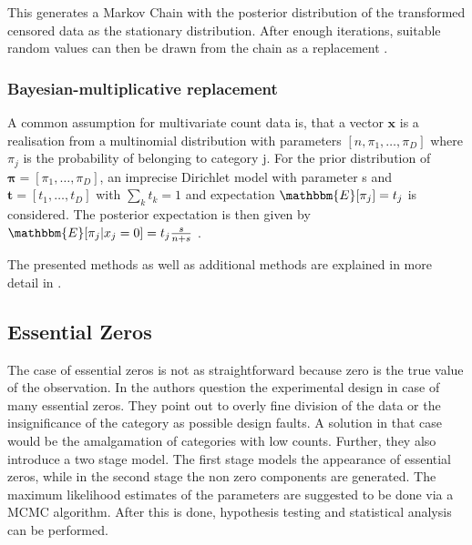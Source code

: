 This generates a Markov Chain with the posterior distribution of the transformed censored data as the stationary distribution. After enough iterations, suitable random values can then be drawn from the chain as a replacement \cite{Palarea-Albaladejo:2015}.


\subsubsection{Bayesian-multiplicative replacement}
\label{sec:Bayesian-multiplicative replacement}

A common assumption for multivariate count data is, that a vector $\bm{x}$ is a realisation from a multinomial distribution with parameters $[n,\pi_1,\ldots,\pi_D]$ where $\pi_j$ is the probability of belonging to category j. For the prior distribution of $\bm{\pi}=[\pi_1,\ldots,\pi_D]$, an imprecise Dirichlet model with parameter s and $\bm{t}=[t_1,\ldots,t_D]$ with $\sum_k t_k=1$ and expectation $\mathbbm{E}[\pi_j]=t_j$ is considered. The posterior expectation is then given by $\mathbbm{E}[\pi_j|x_j=0]=t_j \frac{s}{n+s}$ \cite{Palarea-Albaladejo:2015}.


The presented methods as well as additional methods are explained in more detail in \cite{Palarea-Albaladejo:2015}.

\subsection{Essential Zeros}
\label{sec: Essential Zeros}

The case of essential zeros is not as straightforward because zero is the true value of the observation. In \cite{Aitchison:2003} the authors question the experimental design in case of many essential zeros. They point out to overly fine division of the data or the insignificance of the category as possible design faults. A solution in that case would be the amalgamation of categories with low counts. Further, they also introduce a two stage model. The first stage models the appearance of essential zeros, while in the second stage the non zero components are generated. The maximum likelihood estimates of the parameters are suggested to be done via a MCMC algorithm. After this is done, hypothesis testing and statistical analysis can be performed. 

